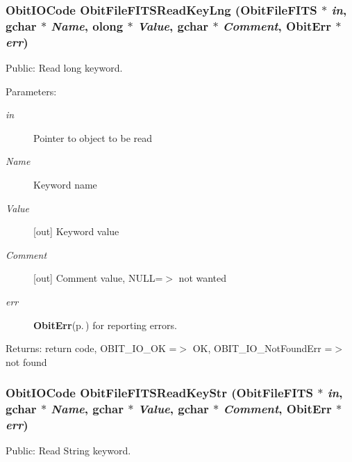 \subsubsection{\setlength{\rightskip}{0pt plus 5cm}Obit\-IOCode Obit\-File\-FITSRead\-Key\-Lng ({\bf Obit\-File\-FITS} $\ast$ {\em in}, gchar $\ast$ {\em Name}, {\bf olong} $\ast$ {\em Value}, gchar $\ast$ {\em Comment}, {\bf Obit\-Err} $\ast$ {\em err})}\label{ObitFileFITS_8h_a17}


Public: Read long keyword. 

\begin{Desc}
\item[Parameters:]
\begin{description}
\item[{\em in}]Pointer to object to be read \item[{\em Name}]Keyword name \item[{\em Value}][out] Keyword value \item[{\em Comment}][out] Comment value, NULL=$>$ not wanted \item[{\em err}]{\bf Obit\-Err}{\rm (p.\,\pageref{structObitErr})} for reporting errors. \end{description}
\end{Desc}
\begin{Desc}
\item[Returns:]return code, OBIT\_\-IO\_\-OK =$>$ OK, OBIT\_\-IO\_\-Not\-Found\-Err =$>$ not found \end{Desc}
\subsubsection{\setlength{\rightskip}{0pt plus 5cm}Obit\-IOCode Obit\-File\-FITSRead\-Key\-Str ({\bf Obit\-File\-FITS} $\ast$ {\em in}, gchar $\ast$ {\em Name}, gchar $\ast$ {\em Value}, gchar $\ast$ {\em Comment}, {\bf Obit\-Err} $\ast$ {\em err})}\label{ObitFileFITS_8h_a14}


Public: Read String keyword. 

